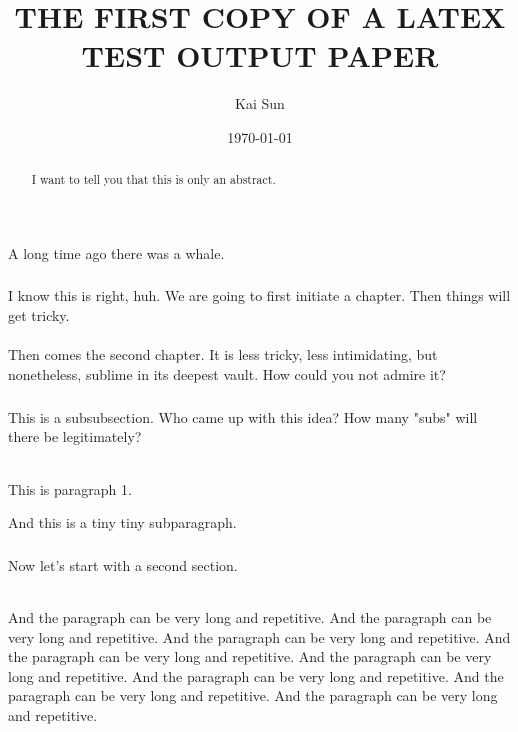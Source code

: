 \documentclass{article}\usepackage[]{graphicx}\usepackage[]{color}
\begin{document}
\begin{abstract}
I want to tell you that this is only an abstract.
\end{abstract}

\tableofcontents

\title{THE FIRST COPY OF A LATEX TEST OUTPUT PAPER}
\author{Kai Sun}
\date{\today}
\maketitle

\part{}
A long time ago there was a whale.

\section{}
I know this is right, huh. We are going to first initiate a chapter. Then things will get tricky.

\subsection{}
Then comes the second chapter. It is less tricky, less intimidating, but nonetheless, sublime in its deepest vault. How could you not admire it?

\subsubsection*{}
This is a subsubsection. Who came up with this idea? How many "subs" will there be legitimately?

\paragraph{}
This is paragraph 1.

\subparagraph{}
And this is a tiny tiny subparagraph.

\section{}
Now let's start with a second section.

\paragraph{}
And the paragraph can be very long and repetitive. And the paragraph can be very long and repetitive. And the paragraph can be very long and repetitive. And the paragraph can be very long and repetitive. And the paragraph can be very long and repetitive. And the paragraph can be very long and repetitive. And the paragraph can be very long and repetitive. And the paragraph can be very long and repetitive.
\end{document}
